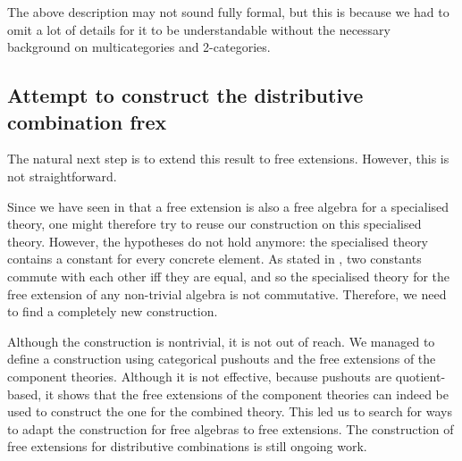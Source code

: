 The above description may not sound fully formal, but this is because we had to omit a lot of details for it to be understandable without the necessary background on multicategories and 2-categories.

\subsection{Attempt to construct the distributive combination frex}
\label{sec:frex_attempt}

The natural next step is to extend this result to free extensions. However, this is not straightforward.

Since we have seen in  that a free extension is also a free algebra for a specialised theory, one might therefore try to reuse our construction on this specialised theory. However, the hypotheses do not hold anymore: the specialised theory contains a constant for every concrete element. As stated in , two constants commute with each other iff they are equal, and so the specialised theory for the free extension of any non-trivial algebra is not commutative. Therefore, we need to find a completely new construction.

Although the construction is nontrivial, it is not out of reach. We managed to define a construction using categorical pushouts and the free extensions of the component theories. Although it is not effective, because pushouts are quotient-based, it shows that the free extensions of the component theories can indeed be used to construct the one for the combined theory. This led us to search for ways to adapt the construction for free algebras to free extensions. The construction of free extensions for distributive combinations is still ongoing work.
